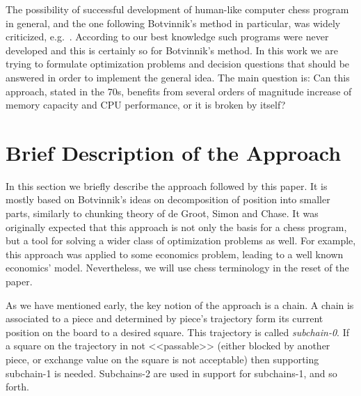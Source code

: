 \documentclass{llncs}
\begin{document}
The possibility of successful development of human-like computer chess
program in general, and the one following Botvinnik's method in
particular, was widely criticized, e.g.~\cite{Berliner:1993:Playing}.
According to our best knowledge such programs were never developed and
this is certainly so for Botvinnik's method. In this work we are
trying to formulate optimization problems and decision questions that
should be answered in order to implement the general idea. The main
question is: Can this approach, stated in the 70s, benefits from
several orders of magnitude increase of memory capacity and CPU
performance, or it is broken by itself?
%




\section{Brief Description of the Approach}\label{sec:general}
In this section we briefly describe the approach followed by this
paper. It is mostly based on Botvinnik's ideas on decomposition of
position into smaller parts, similarly to chunking theory of de Groot,
Simon and Chase. It was originally expected that this approach is not
only the basis for a chess program, but a tool for solving a wider
class of optimization problems as well. For example, this approach was
applied to some economics problem, leading to a well known economics'
model. Nevertheless, we will use chess terminology in the reset of the
paper.

As we have mentioned early, the key notion of the approach is a chain.
A chain is associated to a piece and determined by piece's trajectory
form its current position on the board to a desired square. This
trajectory is called \emph{subchain-0}. If a square on the trajectory
in not <<passable>> (either blocked by another piece, or exchange
value on the square is not acceptable) then supporting subchain-1 is
needed. Subchains-2 are used in support for subchains-1, and so forth.
\end{document}
